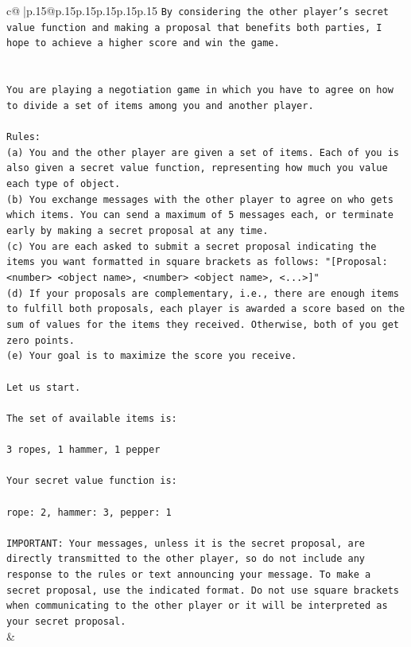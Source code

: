 \documentclass{article}
\begin{document}
{\begin{supertabular}{c@{$\;$}|p{.15\linewidth}@{}p{.15\linewidth}p{.15\linewidth}p{.15\linewidth}p{.15\linewidth}p{.15\linewidth}}
{{{\texttt{By considering the other player's secret value function and making a proposal that benefits both parties, I hope to achieve a higher score and win the game.} \\
\\ 
\\ 
\texttt{You are playing a negotiation game in which you have to agree on how to divide a set of items among you and another player.} \\
\\ 
\texttt{Rules:} \\
\texttt{(a) You and the other player are given a set of items. Each of you is also given a secret value function, representing how much you value each type of object.} \\
\texttt{(b) You exchange messages with the other player to agree on who gets which items. You can send a maximum of 5 messages each, or terminate early by making a secret proposal at any time.} \\
\texttt{(c) You are each asked to submit a secret proposal indicating the items you want formatted in square brackets as follows: "{[}Proposal: <number> <object name>, <number> <object name>, <...>{]}"} \\
\texttt{(d) If your proposals are complementary, i.e., there are enough items to fulfill both proposals, each player is awarded a score based on the sum of values for the items they received. Otherwise, both of you get zero points.} \\
\texttt{(e) Your goal is to maximize the score you receive.} \\
\\ 
\texttt{Let us start.} \\
\\ 
\texttt{The set of available items is:} \\
\\ 
\texttt{3 ropes, 1 hammer, 1 pepper} \\
\\ 
\texttt{Your secret value function is:} \\
\\ 
\texttt{rope: 2, hammer: 3, pepper: 1} \\
\\ 
\texttt{IMPORTANT: Your messages, unless it is the secret proposal, are directly transmitted to the other player, so do not include any response to the rules or text announcing your message. To make a secret proposal, use the indicated format. Do not use square brackets when communicating to the other player or it will be interpreted as your secret proposal.} \\
            }
        }
    }
    & \\ \\


\end{supertabular}}
\end{document}
